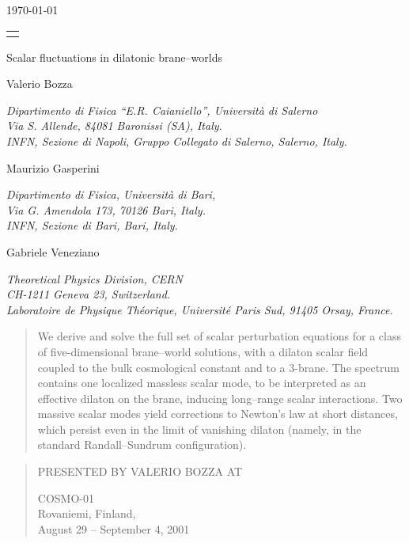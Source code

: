 \documentclass[a4paper,12pt]{article}
\newcommand{\pubdate}[1]{\begin{lrbox}{\sboxpubdate}{#1}\end{lrbox}}
\newcommand{\pubnumber}[1]{\begin{lrbox}{\sboxpubnumber}{\begin{tabular}{l} #1 \\
                 \usebox{\sboxpubdate}
                 \end{tabular}}
                           \end{lrbox}
                           \pubblock}
\newcommand{\Title}[1]{\begin{center} {\Large #1 } \end{center}}
\newcommand{\Author}[1]{\begin{center}{ \sc #1} \end{center}}
\newcommand{\Address}[1]{\begin{center}{ \it #1} \end{center}}
\newcommand{\pubblock}{\rightline{
            \usebox{\sboxpubnumber}}}
\newenvironment{Abstract}{\begin{quotation}  }{\end{quotation}}
\newenvironment{Presented}{\begin{quotation} \begin{center}
             PRESENTED BY VALERIO BOZZA AT\end{center}\bigskip
      \begin{center}\begin{large}}{\end{large}\end{center}
      \end{quotation}}
\begin{document}
\begin{titlepage}
\pubdate{\today}                    %
\pubnumber{} %

\vfill \Title{Scalar fluctuations in dilatonic brane--worlds}
\vfill \Author{Valerio Bozza}

\Address{Dipartimento di Fisica ``E.R. Caianiello'', Universit\`a
di Salerno \\
         Via S. Allende, 84081 Baronissi (SA), Italy. \\
       INFN, Sezione di
Napoli, Gruppo Collegato di Salerno, Salerno, Italy.}

\vspace{.25cm} \Author{Maurizio Gasperini} \Address{Dipartimento
di Fisica, Universit\`a di Bari, \\ Via G. Amendola 173, 70126
Bari, Italy.\\ INFN, Sezione di Bari, Bari, Italy.}

\vspace{.25cm} \Author{Gabriele Veneziano} \Address{Theoretical
Physics Division, CERN \\ CH-1211 Geneva 23, Switzerland.
\\Laboratoire de Physique Th\'eorique, Universit\'e Paris Sud,
91405 Orsay, France.} \vfill

\begin{Abstract}
We derive and solve the full set of scalar perturbation equations
for a class of five-dimensional brane--world solutions, with a dilaton
scalar field coupled to the bulk cosmological constant and to a 3-brane.
The spectrum contains one localized massless scalar mode, to be
interpreted as an effective dilaton on the brane, inducing  long--range
scalar interactions. Two massive scalar modes yield corrections to
Newton's law at short distances, which persist even in the limit of
vanishing dilaton (namely, in the standard Randall--Sundrum
configuration).
\end{Abstract}
\vfill
\begin{Presented}
    COSMO-01 \\
    Rovaniemi, Finland, \\
    August 29 -- September 4, 2001
\end{Presented}
\vfill
\end{titlepage}
\def\thefootnote{\fnsymbol{footnote}}
\setcounter{footnote}{0}
\end{document}
